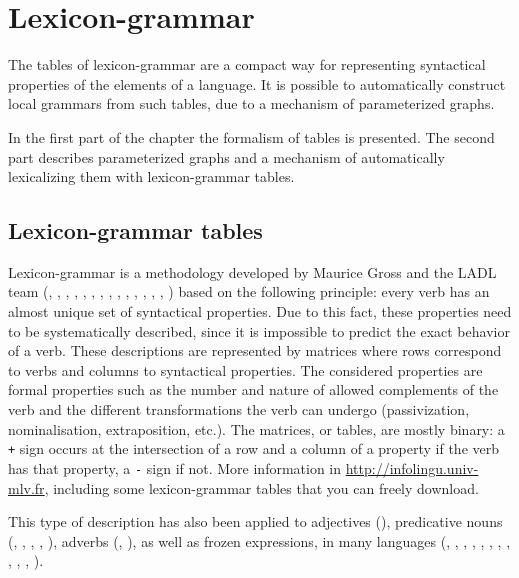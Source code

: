 \chapter{Lexicon-grammar}
\label{chap-lexicon-grammar}
The tables of lexicon-grammar are a compact way for representing syntactical
properties of the elements of a language. It is possible to automatically
construct local grammars from such tables, due to a mechanism of parameterized
graphs. 

\bigskip
\noindent In the first part of the chapter the formalism of tables is presented.
The second part describes parameterized graphs and a mechanism of automatically
lexicalizing them with lexicon-grammar tables.


\section{Lexicon-grammar tables}
Lexicon-grammar is a methodology developed by Maurice Gross and the LADL team
 (\cite{L}, \cite{BGL}, \cite{methodes-en-syntaxe}, \cite{GL},
\cite{gross1994}, \cite{gross1994b}, \cite{gross1991}, \cite{gross1986}, 
\cite{gross1984}, \cite{gross1984b}, \cite{gross1983}, \cite{gross1982}, 
\cite{gross1978}, \cite{leclere2005}, \cite{salkoff2004})
based on the following principle: every verb has an almost unique set of syntactical
properties. Due to this fact, these properties need to be systematically
described, since it is impossible to predict the exact behavior of a verb. These
descriptions are represented by matrices where rows correspond to verbs and
columns to syntactical properties. The considered properties are formal
properties such as the number and nature of allowed complements of the verb and
the different transformations the verb can undergo (passivization,
nominalisation, extraposition, etc.). The matrices, or tables, are mostly binary:
a \verb$+$ sign occurs at the intersection of a row and a column of a property if
the verb has that property, a \verb+-+ sign if not.  More information in \url{http://infolingu.univ-mlv.fr}, including
some lexicon-grammar tables that you can freely download.

\bigskip
\noindent This type of description has also been applied to adjectives
(\cite{these-annie}), predicative nouns (\cite{les-nominalisations},
\cite{les-predicats-nominaux}, \cite{giry1978}, \cite{gross1976},
\cite{ranchhod2001}), 
adverbs (\cite{syntaxe-de-ladverbe},
\cite{grammaire-des-adverbes}), as well as frozen expressions, in many languages
(\cite{lexique-grammaire-allemand2}, \cite{lexique-grammaire-italien2},
\cite{lexique-grammaire-italien}, \cite{lexique-grammaire-coreen2},
\cite{lexique-grammaire-coreen}, \cite{lexique-grammaire-malgache},
\cite{lexique-grammaire-espagnol}, \cite{lexique-grammaire-allemand},
\cite{lexique-grammaire-hongrois}, \cite{ranchhod1996}, \cite{ranchhod1991},
\cite{gross1986b}).

